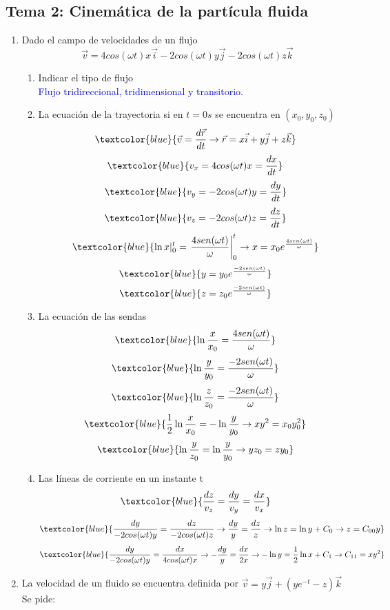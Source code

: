 \subsection{Tema 2: Cinemática de la partícula fluida}
\begin{enumerate}
	\item Dado el campo de velocidades de un flujo
	\[\vec{v}=4cos(\omega t)x\vec{i}-2cos(\omega t)y\vec{j}-2cos(\omega t)z\vec{k}\]
	\begin{enumerate}
		\item Indicar el tipo de flujo\\
		\textcolor{blue}{Flujo tridireccional, tridimensional y transitorio.}
		\item La ecuación de la trayectoria si en $t=0s$ se encuentra en $(x_0,y_0,z_0)$
		\[\textcolor{blue}{\vec{v}=\frac{d\vec{r}}{dt} \rightarrow \vec{r}=x\vec{i}+y\vec{j}+z\vec{k}}\]
		\[\textcolor{blue}{v_x=4cos(\omega t)x=\frac{dx}{dt}}\]
		\[\textcolor{blue}{v_y= -2cos(\omega t)y = \frac{dy}{dt}}\]
		\[\textcolor{blue}{v_z= -2cos(\omega t)z = \frac{dz}{dt}} \]
		\[\textcolor{blue}{\ln x|_0^t=\left.{\frac{4sen(\omega t)}{\omega}}\right |_0^t \rightarrow x=x_0 e^{\frac{4sen(\omega t)}{\omega}}}\]
		\[\textcolor{blue}{y=y_0 e^{\frac{-2sen(\omega t)}{\omega}}}\]
		\[\textcolor{blue}{z=z_0 e^{\frac{-2sen(\omega t)}{\omega}}}\]
		\item La ecuación de las sendas
		\[\textcolor{blue}{\ln \frac{x}{x_0}=\frac{4sen(\omega t)}{\omega}}\]
		\[\textcolor{blue}{\ln \frac{y}{y_0}=\frac{-2sen(\omega t)}{\omega}}\]
		\[\textcolor{blue}{\ln \frac{z}{z_0}=\frac{-2sen(\omega t)}{\omega}}\]
		\[\textcolor{blue}{\frac{1}{2}\ln \frac{x}{x_0}=-\ln \frac{y}{y_0} \rightarrow xy^2=x_0y_0^2}\]
		\[\textcolor{blue}{\ln \frac{y}{z_0}=\ln \frac{y}{y_0} \rightarrow yz_0=zy_0}\]
		\item Las líneas de corriente en un instante t
		\[\textcolor{blue}{\frac{dz}{v_z}=\frac{dy}{v_y}=\frac{dx}{v_x}}\]
		\[\textcolor{blue}{\frac{dy}{-2cos(\omega t)y}=\frac{dz}{-2cos(\omega t)z}\rightarrow \frac{dy}{y}=\frac{dz}{z}\rightarrow \ln z = \ln y + C_0 \rightarrow z=C_{00}y}\]
		\[\textcolor{blue}{\frac{dy}{-2cos(\omega t)y}=\frac{dx}{4cos(\omega t)x}\rightarrow -\frac{dy}{y}=\frac{dx}{2x}\rightarrow -\ln y = \frac{1}{2}\ln x + C_1 \rightarrow C_{11}=xy^2 }\]
	\end{enumerate}
	\item La velocidad de un fluido se encuentra definida por $\vec{v}=y\vec{j}+\left(ye^{-t}-z\right)\vec{k}$ Se pide:
	\begin{enumerate}

\end{enumerate}
\end{enumerate}
